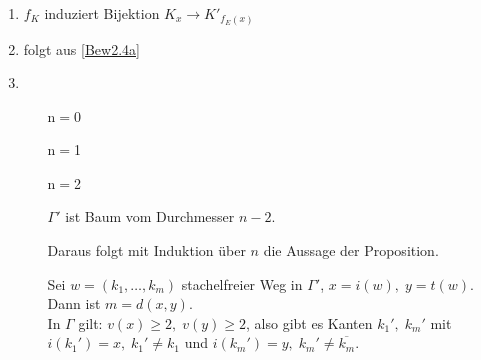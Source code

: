 \documentclass[a4paper, 10pt]{report}
\begin{document}
\begin{Bew}
\begin{enumerate}
  \item \label{Bew2.4a}
  $f_K$ induziert Bijektion $K_x \to K'_{f_E(x)}$
  \item folgt aus \ref{Bew2.4a}
  \item
  \begin{itemize}
    \item[n$=$0]
    
    \item[n$=$1]
    
    \item[n$=$2]
    \\
    \begin{Beh}
      $\Gamma'$ ist Baum vom Durchmesser $n-2$.
    \end{Beh}

    Daraus folgt mit Induktion über $n$ die Aussage der Proposition.
    
    \begin{Bew}
      Sei $w = (k_1, \ldots, k_m)$ stachelfreier Weg in $\Gamma'$, $x=i(w), \; y
      = t(w)$.
      Dann ist $m = d(x,y)$.\\
      In $\Gamma$ gilt: $v(x) \ge 2, \; v(y) \ge 2$, also gibt es Kanten $k_1',
      \; k_m'$ mit $i(k_1')=x, \; k_1' \not= k_1$ und $i(k_m') = y, \; k_m'
      \not= \overline{k_m}$.\\
      

\end{Bew}
\end{itemize}
\end{enumerate}
\end{Bew}
\end{document}
